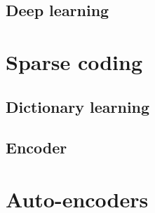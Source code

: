 \documentclass[a4paper,12pt,twoside]{report}
\begin{document}
\subsection{Deep learning}

\section{Sparse coding}

\subsection{Dictionary learning}

\subsection{Encoder}

\section{Auto-encoders}
\end{document}
